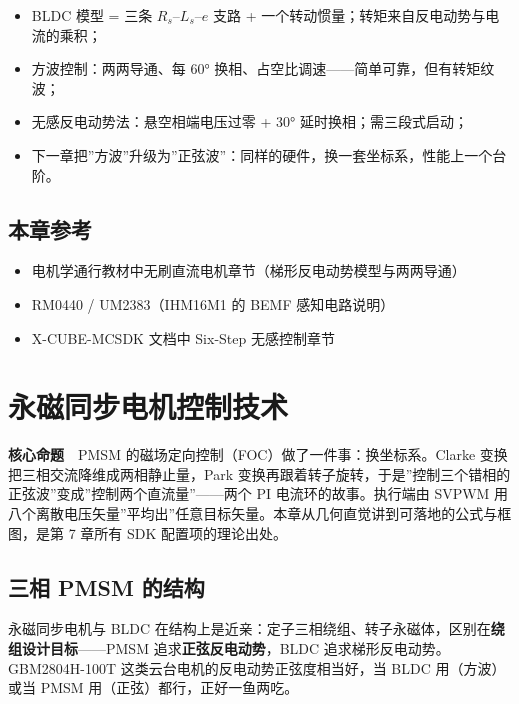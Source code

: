 \documentclass[
  UTF8,
  scheme=plain,
  fontsize=10pt,
  openany
]{ctexbook}
\begin{document}
\begin{itemize}
\tightlist
\item
  BLDC 模型 = 三条 \(R_s\)--\(L_s\)--\(e\) 支路 +
  一个转动惯量；转矩来自反电动势与电流的乘积；
\item
  方波控制：两两导通、每 60°
  换相、占空比调速------简单可靠，但有转矩纹波；
\item
  无感反电动势法：悬空相端电压过零 + 30° 延时换相；需三段式启动；
\item
  下一章把''方波''升级为''正弦波''：同样的硬件，换一套坐标系，性能上一个台阶。
\end{itemize}

\section{本章参考}\label{ux672cux7ae0ux53c2ux8003-4}

\begin{itemize}
\tightlist
\item
  电机学通行教材中无刷直流电机章节（梯形反电动势模型与两两导通）
\item
  RM0440 / UM2383（IHM16M1 的 BEMF 感知电路说明）
\item
  X-CUBE-MCSDK 文档中 Six-Step 无感控制章节
\end{itemize}

\clearpage

\chapter{永磁同步电机控制技术}\label{ux6c38ux78c1ux540cux6b65ux7535ux673aux63a7ux5236ux6280ux672f}

\begin{epigraph}

\textbf{核心命题}　PMSM
的磁场定向控制（FOC）做了一件事：换坐标系。Clarke
变换把三相交流降维成两相静止量，Park
变换再跟着转子旋转，于是''控制三个错相的正弦波''变成''控制两个直流量''------两个
PI 电流环的故事。执行端由 SVPWM
用八个离散电压矢量''平均出''任意目标矢量。本章从几何直觉讲到可落地的公式与框图，是第
7 章所有 SDK 配置项的理论出处。

\end{epigraph}

\section{三相 PMSM 的结构}\label{ux4e09ux76f8-pmsm-ux7684ux7ed3ux6784}

永磁同步电机与 BLDC
在结构上是近亲：定子三相绕组、转子永磁体，区别在\textbf{绕组设计目标}------PMSM
追求\textbf{正弦反电动势}，BLDC 追求梯形反电动势。GBM2804H-100T
这类云台电机的反电动势正弦度相当好，当 BLDC 用（方波）或当 PMSM
用（正弦）都行，正好一鱼两吃。
\end{document}
